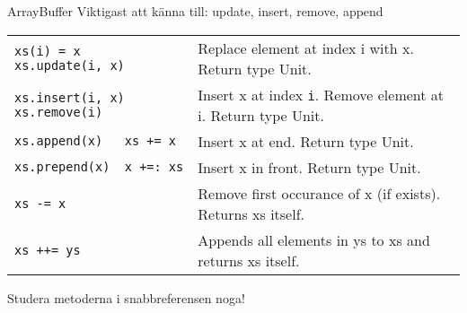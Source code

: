 \begin{Slide}{ArrayBuffer}
Viktigast att känna till: update, insert, remove, append
{\SlideFontTiny

\vspace{2.5em}\begin{tabular}{@{}p{4.2cm}  p{6.5cm}}
\texttt{xs(i) = x \newline xs.update(i, x)} & Replace element at index i with x. \newline Return type Unit.\\   \cline{1-2}

\texttt{xs.insert(i, x)\newline xs.remove(i)} & Insert x at index \texttt{i}. Remove element at i. \newline Return type Unit.\\   \cline{1-2}

\texttt{xs.append(x)~~~xs~+=~x} & Insert x at end.  Return type Unit.\\   \cline{1-2}

\texttt{xs.prepend(x)~~x~+=:~xs} & Insert x in front.  Return type Unit.\\   \cline{1-2}

\texttt{xs -= x} & Remove first occurance of x (if exists). \newline Returns xs itself. \\\cline{1-2}

\texttt{xs ++= ys} & Appends all elements in ys to xs and returns xs itself. \\

\end{tabular}
}

\vspace{2em}Studera metoderna i snabbreferensen noga!
\end{Slide}



